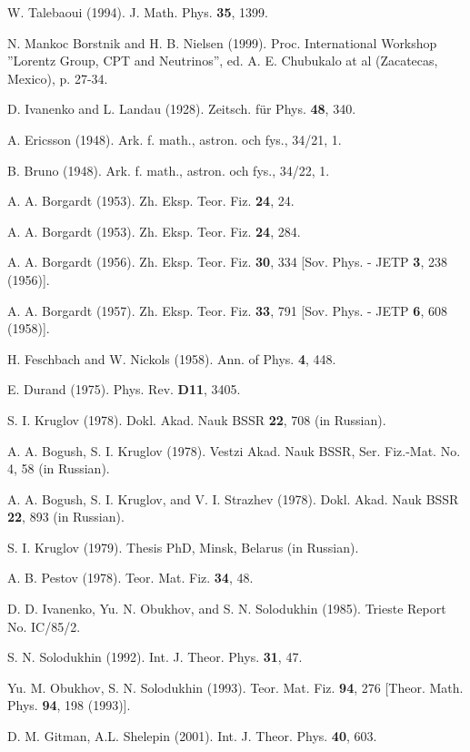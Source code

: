 \documentclass[a4paper,12pt]{article}
\begin{document}
\begin{thebibliography}{99}
  W. Talebaoui (1994). J. Math. Phys. \textbf{35}, 1399.

  N. Mankoc Borstnik and H. B. Nielsen (1999). Proc.
International Workshop ''Lorentz Group, CPT and Neutrinos'', ed. A. E.
Chubukalo at al (Zacatecas, Mexico), p. 27-34.

  D. Ivanenko and L. Landau (1928). Zeitsch. f\"ur Phys. \textbf{
48}, 340.

  A. Ericsson (1948). Ark. f. math., astron. och fys., 34/21, 1.

  B. Bruno (1948). Ark. f. math., astron. och fys., 34/22, 1.

  A. A. Borgardt (1953). Zh. Eksp. Teor. Fiz. \textbf{24}, 24.

  A. A. Borgardt (1953). Zh. Eksp. Teor. Fiz. \textbf{24}, 284.

  A. A. Borgardt (1956). Zh. Eksp. Teor. Fiz. \textbf{30}, 334
[Sov. Phys. - JETP \textbf{3}, 238 (1956)].

  A. A. Borgardt (1957). Zh. Eksp. Teor. Fiz. \textbf{33}, 791
[Sov. Phys. - JETP \textbf{6}, 608 (1958)].

  H. Feschbach and W. Nickols (1958). Ann. of Phys. \textbf{4},
448.

  E. Durand (1975). Phys. Rev. \textbf{D11}, 3405.

  S. I. Kruglov (1978). Dokl. Akad. Nauk BSSR \textbf{22}, 708
(in Russian).

  A. A. Bogush, S. I. Kruglov (1978). Vestzi Akad. Nauk BSSR,
Ser. Fiz.-Mat. No. 4, 58 (in Russian).

  A. A. Bogush, S. I. Kruglov, and V. I. Strazhev (1978). Dokl.
Akad. Nauk BSSR \textbf{22}, 893 (in Russian).

  S. I. Kruglov (1979). Thesis PhD, Minsk, Belarus (in Russian).

  A. B. Pestov (1978). Teor. Mat. Fiz. \textbf{34}, 48.

  D. D. Ivanenko, Yu. N. Obukhov, and S. N. Solodukhin (1985).
Trieste Report No. IC/85/2.

  S. N. Solodukhin (1992). Int. J. Theor. Phys. \textbf{31}, 47.

  Yu. M. Obukhov, S. N. Solodukhin (1993). Teor. Mat. Fiz.
\textbf{94}, 276 [Theor. Math. Phys. \textbf{94}, 198 (1993)].

  D. M. Gitman, A.L. Shelepin (2001). Int. J. Theor. Phys.
\textbf{40}, 603.


\end{thebibliography}
\end{document}
